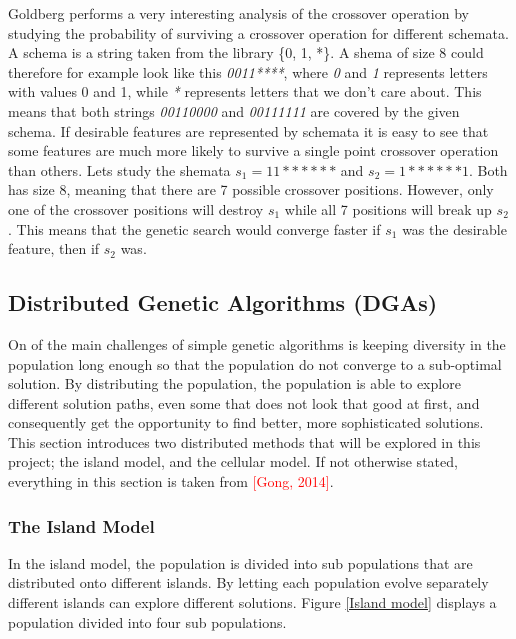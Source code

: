 \documentclass{article}
\begin{document}
\noindent Goldberg performs a very interesting analysis of the crossover operation by studying the probability of surviving a crossover operation for different schemata. A schema is a string taken from the library \{0, 1, *\}.  A shema of size 8 could therefore for example look like this \textit{0011****}, where \textit{0} and \textit{1} represents letters with values 0 and 1, while \textit{*} represents letters that we don't care about. This means that both strings \textit{00110000} and \textit{00111111} are covered by the given schema. If desirable features are represented by schemata it is easy to see that some features are much more likely to survive a single point crossover operation than others. Lets study the shemata $s_1 = 11******$ and $s_2  = 1******1$. Both has size 8, meaning that there are 7 possible crossover positions. However, only one of the crossover positions will destroy $s_1$ while all 7 positions will break up $s_2$. This means that the genetic search would converge faster if $s_1$ was the desirable feature, then if $s_2$ was.


\subsection{Distributed Genetic Algorithms (DGAs)}
On of the main challenges of simple genetic algorithms is keeping diversity in the population long enough so that the population do not converge to a sub-optimal solution. By distributing the population, the population is able to explore different solution paths, even some that does not look that good at first, and consequently get the opportunity to find better, more sophisticated solutions. This section introduces two distributed methods that will be explored in this project; the island model, and the cellular model. If not otherwise stated, everything in this section is taken from \textcolor{red}{[Gong, 2014]}.


\subsubsection{The Island Model}
In the island model, the population is divided into sub populations that are distributed onto different islands. By letting each population evolve separately different islands can explore different solutions. Figure \ref{Island model} displays a population divided into four sub populations. \\ 


\end{document}
